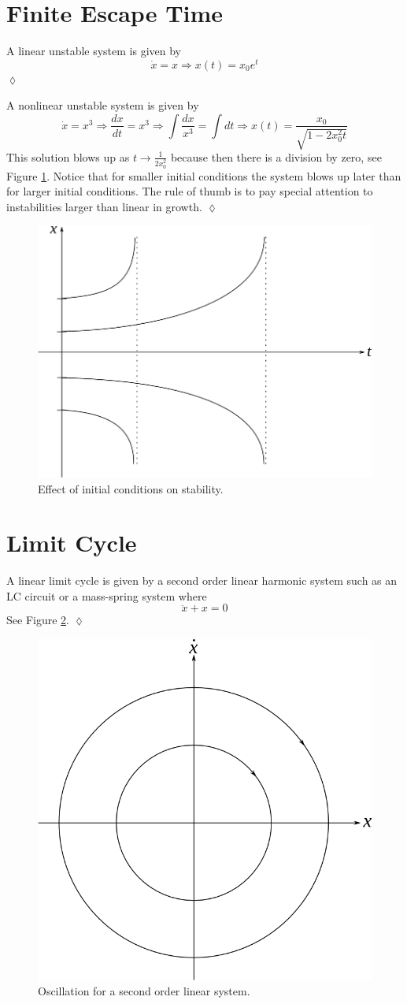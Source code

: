\section{Finite Escape Time}
\begin{example}
A linear unstable system is given by
$$\dot{x} = x \Rightarrow x(t) = x_0e^t$$
$\lozenge$
\end{example}

\begin{example}
A nonlinear unstable system is given by
$$\dot{x} = x^3 \Rightarrow \frac{dx}{dt}=x^3 \Rightarrow \int\frac{dx}{x^3} = \int dt \Rightarrow x(t) = \frac{x_0}{\sqrt{1-2x_0^2t}}$$
This solution blows up as $t\to\frac{1}{2x_0^2}$ because then there is a division by zero, see Figure \ref{fig:01blowup}. Notice that for smaller initial conditions the system blows up later than for larger initial conditions. The rule of thumb is to pay special attention to instabilities larger than linear in growth.
$\lozenge$
\end{example}

\begin{figure}[ht!]
	\centering
	\includegraphics[width=.4\textwidth]{images/01blowup}
	\caption{Effect of initial conditions on stability.}
	\label{fig:01blowup}
\end{figure}

\section{Limit Cycle}
\begin{example}
A linear limit cycle is given by a second order linear harmonic system such as an LC circuit or a mass-spring system where
$$\ddot{x} + x = 0$$
See Figure \ref{fig:01secondorder}.
$\lozenge$
\end{example}

\begin{figure}[ht!]
	\centering
	\includegraphics[width=.4\textwidth]{images/01secondorder}
	\caption{Oscillation for a second order linear system.}
	\label{fig:01secondorder}
\end{figure}


